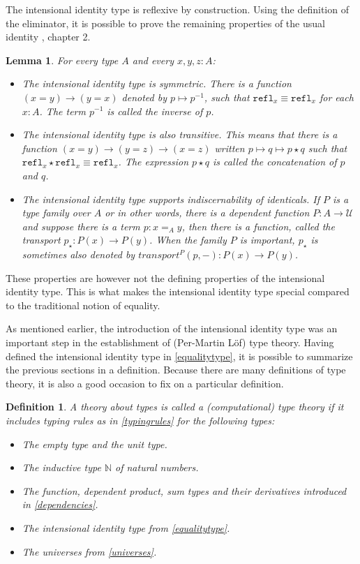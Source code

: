 \documentclass[12pt,a4paper,twoside,xetex,draft]{book}
\newcommand{\keyword}[1]{\emph{#1}\index{#1}}
\newtheorem{lemma}[theorem]{Lemma}
\newtheorem{definition}[theorem]{Definition}
\newcommand{\op}[1]{\mathtt{#1}}
\begin{document}
The intensional identity type is reflexive by construction. Using the definition of the eliminator, it is possible to prove the remaining properties of the usual identity \cite{Voevodsky2013}, chapter 2. 

\begin{lemma}
  For every type $A$ and every $x,y,z:A$:
  \begin{itemize}
  \item The intensional identity type is symmetric. There is a function $(x=y)\rightarrow (y=x)$ denoted by $p \mapsto p^{-1}$, such that $\op{refl}_x\equiv \op{refl}_x$ for each $x: A$. The term $p^{-1}$ is called the inverse of $p$.
  \item The intensional identity type is also transitive. This means that there is a function $(x=y)\rightarrow (y=z) \rightarrow (x=z)$ written $p \mapsto q \mapsto p \star q$ such that $\op{refl}_x \star \op{refl}_x \equiv \op{refl}_x$. The expression $ p \star q$ is called the \keyword{concatenation} of $p$ and $q$.
    \item The intensional identity type supports indiscernability of identicals. If $P$ is a type family over $A$ or in other words, there is a dependent function $P:A \rightarrow \mathcal{U}$ and suppose there is a term $p: x=_Ay$, then there is a function, called the transport $p_\star:P(x)\rightarrow P(y)$. When the family $P$ is important, $p_\star$ is sometimes also denoted by $transport^P(p,-):P(x) \rightarrow P(y)$.
    \end{itemize}
\end{lemma}

These properties are however not the defining properties of the intensional identity type. This is what makes the intensional identity type special compared to the traditional notion of equality.


As mentioned earlier, the introduction of the intensional identity type was an important step in the establishment of (Per-Martin L\"of) type theory. Having defined the intensional identity type in \cref{equalitytype}, it is possible to summarize the previous sections in a definition. Because there are many definitions of type theory, it is also a good occasion to fix on a particular definition.

\begin{definition}\label{typetheory}
  A theory about types is called a (computational) \keyword{type theory} if it includes typing rules as in \cref{typingrules} for the following types:
  \begin{itemize}
   \item The empty type and the unit type.
   \item The inductive type $\mathbb{N}$ of natural numbers.
   \item The function, dependent product, sum types and their derivatives introduced in \cref{dependencies}.
   \item The intensional identity type from \cref{equalitytype}.
   \item The universes from \cref{universes}.
  \end{itemize}
\end{definition}
\end{document}
